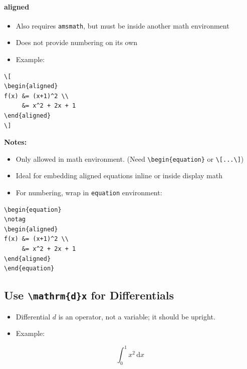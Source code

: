 \documentclass[12pt,a4paper]{article}
\begin{document}
\paragraph{aligned}
\begin{itemize}
    \item Also requires \texttt{amsmath}, but must be inside another math environment
    \item Does not provide numbering on its own
    \item Example:
\end{itemize}

\begin{verbatim}
\[
\begin{aligned}
f(x) &= (x+1)^2 \\
     &= x^2 + 2x + 1
\end{aligned}
\]
\end{verbatim}

\textbf{Notes:}
\begin{itemize}
    \item Only allowed in math environment. (Need \verb|\begin{equation}| or \verb|\[...\]|)
    \item Ideal for embedding aligned equations inline or inside display math
    \item For numbering, wrap in \texttt{equation} environment:
\end{itemize}

\begin{verbatim}
\begin{equation}
\notag
\begin{aligned}
f(x) &= (x+1)^2 \\
     &= x^2 + 2x + 1
\end{aligned}
\end{equation}
\end{verbatim}

\subsection{Use \texttt{\textbackslash mathrm\{d\}x} for Differentials}

\begin{itemize}
    \item Differential $d$ is an operator, not a variable; it should be upright.
    \item Example:
\end{itemize}

\[
\int_0^1 x^2\,\mathrm{d}x
\]
\end{document}
